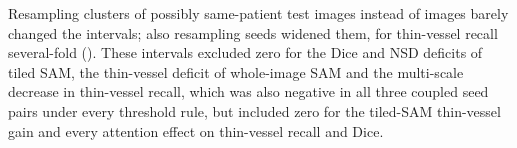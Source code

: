 Resampling \PHNClusters{} clusters of possibly same-patient test images instead of images barely changed the intervals;
also resampling seeds widened them, for thin-vessel recall several-fold (). These
intervals excluded zero for the Dice and NSD deficits of tiled SAM, the thin-vessel deficit of whole-image SAM and the
multi-scale decrease in thin-vessel recall, which was also negative in all three coupled seed pairs under every threshold
rule, but included zero for the tiled-SAM thin-vessel gain and every attention effect on thin-vessel recall and
Dice.
